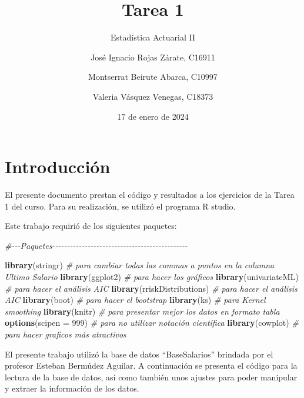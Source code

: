 \documentclass[
]{article}
\title{Tarea 1}
\subtitle{Estadística Actuarial II}
\author{José Ignacio Rojas Zárate, C16911 \and Montserrat Beirute
Abarca, C10997 \and Valeria Vásquez Venegas, C18373}
\date{17 de enero de 2024}
\newenvironment{Shaded}{\begin{snugshade}}{\end{snugshade}}
\newcommand{\AttributeTok}[1]{\textcolor[rgb]{0.13,0.29,0.53}{#1}}
\newcommand{\CommentTok}[1]{\textcolor[rgb]{0.56,0.35,0.01}{\textit{#1}}}
\newcommand{\DecValTok}[1]{\textcolor[rgb]{0.00,0.00,0.81}{#1}}
\newcommand{\FunctionTok}[1]{\textcolor[rgb]{0.13,0.29,0.53}{\textbf{#1}}}
\newcommand{\NormalTok}[1]{#1}
\begin{document}
\maketitle

{
\setcounter{tocdepth}{2}
\tableofcontents
}
\newpage

\hypertarget{introducciuxf3n}{%
\section{Introducción}\label{introducciuxf3n}}

El presente documento prestan el código y resultados a los ejercicios de
la Tarea 1 del curso. Para su realización, se utilizó el programa R
studio.

Este trabajo requirió de los siguientes paquetes:

\begin{Shaded}
\begin{Highlighting}[]
\CommentTok{\#{-}{-}{-}Paquetes{-}{-}{-}{-}{-}{-}{-}{-}{-}{-}{-}{-}{-}{-}{-}{-}{-}{-}{-}{-}{-}{-}{-}{-}{-}{-}{-}{-}{-}{-}{-}{-}{-}{-}{-}{-}{-}{-}{-}{-}{-}{-}{-}{-}{-}{-}}

\FunctionTok{library}\NormalTok{(stringr) }\CommentTok{\# para cambiar todas las commas a puntos en la columna Ultimo Salario}
\FunctionTok{library}\NormalTok{(ggplot2) }\CommentTok{\# para hacer los gráficos}
\FunctionTok{library}\NormalTok{(univariateML) }\CommentTok{\# para hacer el análisis AIC}
\FunctionTok{library}\NormalTok{(rriskDistributions) }\CommentTok{\# para hacer el análisis AIC}
\FunctionTok{library}\NormalTok{(boot) }\CommentTok{\# para hacer el bootstrap}
\FunctionTok{library}\NormalTok{(ks) }\CommentTok{\# para Kernel smoothing}
\FunctionTok{library}\NormalTok{(knitr) }\CommentTok{\# para presentar mejor los datos en formato tabla}
\FunctionTok{options}\NormalTok{(}\AttributeTok{scipen =} \DecValTok{999}\NormalTok{) }\CommentTok{\# para no utilizar notación científica}
\FunctionTok{library}\NormalTok{(cowplot) }\CommentTok{\# para hacer graficos más atractivos}
\end{Highlighting}
\end{Shaded}

El presente trabajo utilizó la base de datos ``BaseSalarios'' brindada
por el profesor Esteban Bermúdez Aguilar. A continuación se presenta el
código para la lectura de la base de datos, así como también unos
ajustes para poder manipular y extraer la información de los datos.
\end{document}
